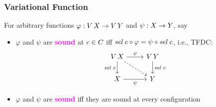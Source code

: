 \documentclass[draft,notes=show,xcolor=dvipsnames]{beamer}
\newcommand*{\vocab}[1]{\textbf{\textcolor{magenta}{#1}}}
\begin{document}
\begin{frame}[fragile]
  \frametitle{Variational Function}
  \begin{definition}[Soundness]
    For arbitrary functions $\varphi : \Var[\Val] \to \Var[\ValY]$ and $\psi : \Val \to \ValY$, say
    \begin{itemize}
      \item $\varphi$ and $\psi$ are \vocab{sound} \alert<2>{at $\cE \in \cS$} iff $\sel\ \cE \comp \varphi = \psi \comp \sel\ \cE$, i.e., TFDC:
      $$
        \begin{tikzcd}
          \Var[\Val] \ar[d, "\sel\ \cE"'] \ar[r, "\varphi"] \ar[dr, dashed] &
          \Var[\ValY] \ar[d, "\sel\ \cE"] \\
          \Val \ar[r, "\psi"'] & \ValY
        \end{tikzcd}
      $$
      \item $\varphi$ and $\psi$ are \vocab{sound} iff they are sound \alert<2>{at every configuration}
    \end{itemize}
  \end{definition}
\end{frame}
\end{document}
